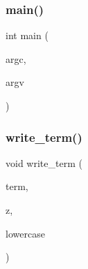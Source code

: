 \subsubsection{\texorpdfstring{main()}{main()}}
{\footnotesize\ttfamily int main (\begin{DoxyParamCaption}\item[{int}]{argc,  }\item[{char $\ast$$\ast$}]{argv }\end{DoxyParamCaption})}

\mbox{\label{irk-warc_8cpp_a44adaf0886fa4ffc57f8ea4447218597}} 
\subsubsection{\texorpdfstring{write\+\_\+term()}{write\_term()}}
{\footnotesize\ttfamily void write\+\_\+term (\begin{DoxyParamCaption}\item[{std\+::string \&\&}]{term,  }\item[{\mbox{\hyperlink{structSN__env}{S\+N\+\_\+env}} $\ast$}]{z,  }\item[{bool}]{lowercase }\end{DoxyParamCaption})}

